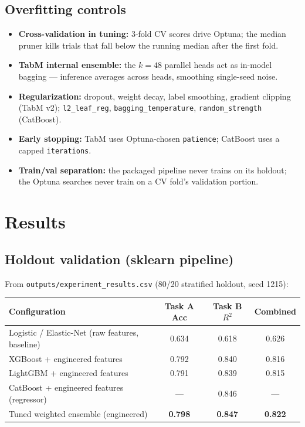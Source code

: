 \documentclass[11pt,a4paper]{article}
\begin{document}
\subsection{Overfitting controls}

\begin{itemize}[leftmargin=*,nosep]
  \item \textbf{Cross-validation in tuning:} 3-fold CV scores drive Optuna; the median pruner kills trials that fall below the running median after the first fold.
  \item \textbf{TabM internal ensemble:} the $k{=}48$ parallel heads act as in-model bagging --- inference averages across heads, smoothing single-seed noise.
  \item \textbf{Regularization:} dropout, weight decay, label smoothing, gradient clipping (TabM v2); \texttt{l2\_leaf\_reg}, \texttt{bagging\_temperature}, \texttt{random\_strength} (CatBoost).
  \item \textbf{Early stopping:} TabM uses Optuna-chosen \texttt{patience}; CatBoost uses a capped \texttt{iterations}.
  \item \textbf{Train/val separation:} the packaged pipeline never trains on its holdout; the Optuna searches never train on a CV fold's validation portion.
\end{itemize}

\section{Results}

\subsection{Holdout validation (sklearn pipeline)}

From \texttt{outputs/experiment\_results.csv} (80/20 stratified holdout, seed 1215):

\begin{table}[h]
\centering
\small
\begin{tabular}{lccc}
\toprule
\textbf{Configuration} & \textbf{Task A Acc} & \textbf{Task B $R^2$} & \textbf{Combined} \\
\midrule
Logistic / Elastic-Net (raw features, baseline) & 0.634 & 0.618 & 0.626 \\
XGBoost + engineered features & 0.792 & 0.840 & 0.816 \\
LightGBM + engineered features & 0.791 & 0.839 & 0.815 \\
CatBoost + engineered features (regressor) & --- & 0.846 & --- \\
Tuned weighted ensemble (engineered) & \textbf{0.798} & \textbf{0.847} & \textbf{0.822} \\
\bottomrule
\end{tabular}
\end{table}
\end{document}
